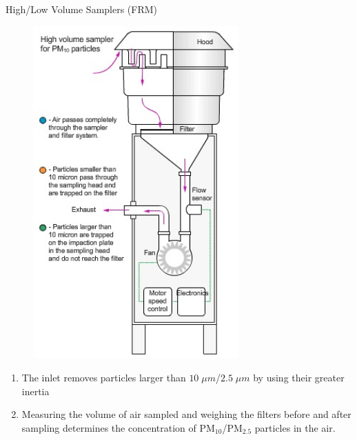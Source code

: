 \documentclass[handout]{beamer} %
\begin{document}
\begin{frame}{High/Low Volume Samplers (FRM)}
    \begin{minipage}[t]{0.49\textwidth}
        \begin{figure}
        \centering
        \includegraphics[width=0.7\textwidth]{img/appendix/Aim2/hivol-sampler.jpg}
    \end{figure}
    \end{minipage}
    \begin{minipage}[t]{0.49\textwidth}
        \begin{enumerate}
            \item The inlet removes particles larger than $10\;\mu m$/$2.5\;\mu m$ by using their greater inertia
            \item Measuring the volume of air sampled and weighing the filters before and after sampling determines the concentration of PM$_{10}$/PM$_{2.5}$ particles in the air.
        \end{enumerate}
    \end{minipage}
\end{frame}
\end{document}
